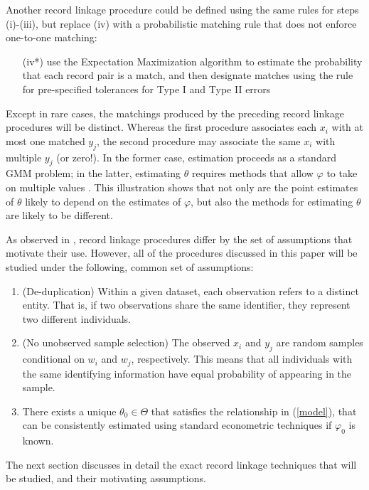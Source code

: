 \documentclass[12pt]{article}
\begin{document}
Another record linkage procedure could be defined using the same rules for steps (i)-(iii), but replace (iv) with a probabilistic matching rule that does not enforce one-to-one matching:
\begin{enumerate}
\item[(iv*)]  use the Expectation Maximization algorithm to estimate the probability that each record pair is a match, and then  designate matches using the \cite{fellegi69} rule for pre-specified tolerances for Type I and Type II errors 
\end{enumerate} 

Except in rare cases, the matchings produced by the preceding record linkage procedures will be distinct.  Whereas the first procedure associates each $x_i$ with at most one matched $y_j$, the second procedure may associate the same $x_i$ with multiple $y_j$ (or zero!).  In the former case, estimation proceeds as a standard GMM problem; in the latter, estimating $\theta$ requires methods that allow $\varphi$ to take on multiple values \citep{ahl2019}.  This illustration shows that not only are the point estimates of $\theta$ likely to depend on the estimates of $\varphi$, but also the methods for estimating $\theta$ are likely to be different. 

As observed in \cite{bailey2017}, record linkage procedures differ by the set of assumptions that motivate their use.  However, all of the procedures discussed in this paper will be studied under the following, common set of assumptions:
\begin{enumerate}
\item (De-duplication) Within a given dataset, each observation refers to a distinct entity.  That is, if two observations share the same identifier, they represent two different individuals.
\item (No unobserved sample selection) The observed $x_i$ and $y_j$ are random samples conditional on $w_i$ and $w_j$, respectively.  This means that all individuals with the same identifying information have equal probability of appearing in the sample. 
\item There exists a unique $\theta_0 \in \Theta$ that satisfies the relationship in (\ref{model}), that can be consistently estimated using standard econometric techniques if $\varphi_0$ is known.
\end{enumerate}

The next section discusses in detail the exact record linkage techniques that will be studied, and their motivating assumptions.
\end{document}
